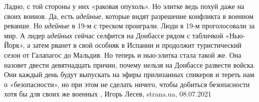 Ладно, с той стороны у них «раковая опухоль». Но элитке ведь похуй даже на
своих воинов.  Да, есть \emph{идейные}, которые видят разрешение конфликта в
военном реванше.  Но \emph{идейные} в 19-м с треском проиграли. Люди в 19-м
проголосовали за мир.  А лидер \emph{идейных} сейчас селфится на Донбассе рядом
с табличкой «Нью-Йорк», а затем рванет в свой особняк в Испании и продолжит
туристический сезон от Галапагос до Мальдив.  Но теперь и нью-элитка стала
такой же. Она назовет двести девятнадцать причин, почему нельзя на Донбассе
развести войска.  Они каждый день будут выпускать на эфиры прилизанных спикеров
и тереть нам о «безопасности», но при этом не сделать ничего, чтобы добиться
безопасности хотя бы для своих же военных
, 
Игорь Лесев, strana.ua, 08.07.2021

